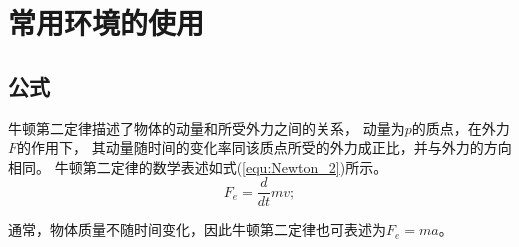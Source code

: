 
\chapter{常用环境的使用}
\section{公式}
牛顿第二定律描述了物体的动量和所受外力之间的关系，
动量为$p$的质点，在外力$F$的作用下，
其动量随时间的变化率同该质点所受的外力成正比，并与外力的方向相同。
牛顿第二定律的数学表述如式(\ref{equ:Newton_2})所示。
\begin{equation}
  F_e=\frac{d}{dt}mv;
  \label{equ:Newton_2}
\end{equation}

\begin{note}
\end{note}

通常，物体质量不随时间变化，因此牛顿第二定律也可表述为$F_e=ma$。


